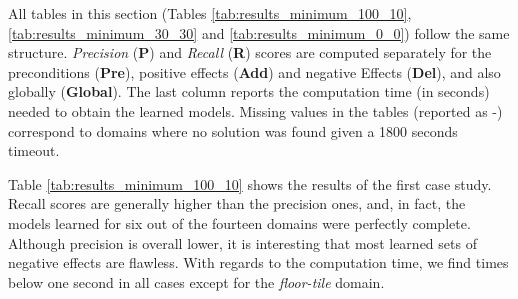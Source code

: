 All tables in this section (Tables \ref{tab:results_minimum_100_10}, \ref{tab:results_minimum_30_30} and \ref{tab:results_minimum_0_0}) follow the same structure. {\em Precision} ({\bf P}) and {\em Recall} ({\bf R}) scores are computed separately for the preconditions ({\bf Pre}), positive effects ({\bf Add}) and negative Effects ({\bf Del}), and also globally ({\bf Global}). The last column reports the computation time (in seconds) needed to obtain the learned models. Missing values in the tables (reported as -) correspond to domains where no solution was found given a 1800 seconds timeout.

Table \ref{tab:results_minimum_100_10} shows the results of the first case study. Recall scores are generally higher than the precision ones, and, in fact, the models learned for six out of the fourteen domains were perfectly complete. Although precision is overall lower, it is interesting that most learned sets of negative effects are flawless. With regards to the computation time, we find times below one second in all cases except for the {\em floor-tile} domain.


